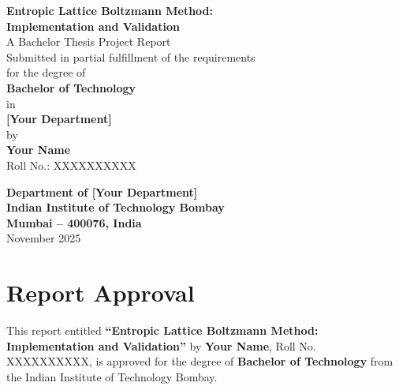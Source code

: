 \documentclass[12pt, a4paper, twoside, openright]{report}
\theoremstyle{definition}
\theoremstyle{remark}
\newcommand\myemptypage{
    \null
    \thispagestyle{empty}
    \addtocounter{page}{-1}
    \newpage
}
\def\thesistitle{Entropic Lattice Boltzmann Method: Implementation and Validation}
\def\authorname{Your Name}
\def\rollnumber{XXXXXXXXXX}
\def\deptname{Department of [Your Department]}
\def\univname{Indian Institute of Technology Bombay}
\begin{document}
\frontmatter
{}

\begin{titlepage}
\begin{center}
\vspace*{1cm}

{\LARGE \textbf{Entropic Lattice Boltzmann Method:}}\\[0.5cm]
{\LARGE \textbf{Implementation and Validation}}\\[2cm]

{\large A Bachelor Thesis Project Report}\\[0.5cm]
{\large Submitted in partial fulfillment of the requirements}\\[0.3cm]
{\large for the degree of}\\[0.5cm]

{\Large \textbf{Bachelor of Technology}}\\[0.5cm]
{\large in}\\[0.5cm]
{\Large \textbf{[Your Department]}}\\[2cm]

{\large by}\\[0.5cm]
{\Large \textbf{\authorname}}\\[0.3cm]
{\large Roll No.: \rollnumber}\\[2cm]

\vfill

{\large \textbf{\deptname}}\\[0.3cm]
{\large \textbf{\univname}}\\[0.3cm]
{\large \textbf{Mumbai -- 400076, India}}\\[0.5cm]
{\large November 2025}

\end{center}
\end{titlepage}

\myemptypage

\chapter*{Report Approval}

\vspace{1cm}
\noindent This report entitled \textbf{``\thesistitle''} by \textbf{\authorname}, Roll No. \rollnumber, is approved for the degree of \textbf{Bachelor of Technology} from the \univname.

\vspace{3cm}
\end{document}
